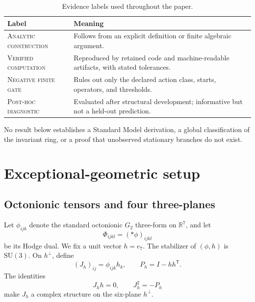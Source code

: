 \documentclass[11pt]{article}
\newcommand{\SU}{\mathrm{SU}}
\newcommand{\status}[1]{\textsc{#1}}
\begin{document}
\begin{table}[t]
\centering
\caption{Evidence labels used throughout the paper.}
\label{tab:status}
\begin{tabularx}{\textwidth}{@{}>{\raggedright\arraybackslash}p{}X@{}}
\toprule
Label & Meaning \\
\midrule
\status{Analytic construction} & Follows from an explicit definition or finite algebraic argument. \\
\status{Verified computation} & Reproduced by retained code and machine-readable artifacts, with stated tolerances. \\
\status{Negative finite gate} & Rules out only the declared action class, starts, operators, and thresholds. \\
\status{Post-hoc diagnostic} & Evaluated after structural development; informative but not a held-out prediction. \\
\bottomrule
\end{tabularx}
\end{table}

No result below establishes a Standard Model derivation, a global classification of the invariant ring, or a proof that unobserved stationary branches do not exist.

\section{Exceptional-geometric setup}
\label{sec:setup}

\subsection{Octonionic tensors and four three-planes}

Let $\phi_{ijk}$ denote the standard octonionic $G_2$ three-form on $\mathbb R^7$, and let
\begin{equation}
  \Phi_{ijkl}=(*\phi)_{ijkl}
\end{equation}
be its Hodge dual.  We fix a unit vector $h=e_7$.  The stabilizer of $(\phi,h)$ is $\SU(3)$.  On $h^\perp$, define
\begin{equation}
  (J_h)_{ij}=\phi_{ijk}h_k,\qquad
  P_h=I-hh^{\mathsf T}.
  \label{eq:Jh}
\end{equation}
The identities
\begin{equation}
  J_h h=0,\qquad J_h^2=-P_h
  \label{eq:complex-identity}
\end{equation}
make $J_h$ a complex structure on the six-plane $h^\perp$.
\end{document}

